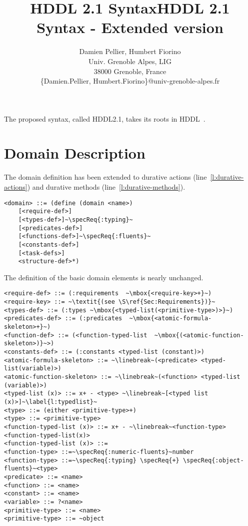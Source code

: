 \documentclass[letterpaper]{article} %
\title{HDDL 2.1 Syntax}
\author{
Damien Pellier, Humbert Fiorino\\
Univ. Grenoble Alpes, LIG\\
38000 Grenoble, France\\
\{Damien.Pellier, Humbert.Fiorino\}@univ-grenoble-alpes.fr}
\title{HDDL 2.1 Syntax - Extended version}
\begin{document}
\maketitle


The proposed syntax, called HDDL2.1, takes its roots in HDDL~\citep{holler20}.

\section{Domain Description}

\newcommand{\specReq}[1]{\ensuremath{\mathtt{^{#1}}}}

The domain definition has been extended to durative actions (line~\ref{l:durative-actions}) and durative methods (line~\ref{l:durative-methods}).
\begin{lstlisting}[escapechar=~]
<domain> ::= (define (domain <name>)
    [<require-def>]
    [<types-def>]~\specReq{:typing}~
    [<predicates-def>]
    [<functions-def>]~\specReq{:fluents}~
    [<constants-def>]
    [<task-defs>]
    <structure-def>*)
\end{lstlisting}

%
%
%

\noindent The definition of the basic domain elements is nearly unchanged.

\begin{lstlisting}[firstnumber=last, escapechar=~]
<require-def> ::= (:requirements  ~\mbox{<require-key>+}~)
<require-key> ::= ~\textit{(see \S\ref{Sec:Requirements})}~
<types-def> ::= (:types ~\mbox{<typed-list(<primitive-type>)>}~)
<predicates-def> ::= (:predicates  ~\mbox{<atomic-formula-skeleton>+}~)
<function-def> ::= (<function-typed-list  ~\mbox{(<atomic-function-skeleton>)}~>)
<constants-def> ::= (:constants <typed-list (constant)>)
<atomic-formula-skeleton> ::= ~\linebreak~(<predicate> <typed-list(variable)>)
<atomic-function-skeleton> ::= ~\linebreak~(<function> <typed-list (variable)>)
<typed-list (x)> ::= x+ - <type> ~\linebreak~[<typed list (x)>]~\label{l:typedlist}~
<type> ::= (either <primitive-type>+)
<type> ::= <primitive-type>
<function-typed-list (x)> ::= x+ - ~\linebreak~<function-type> <function-typed-list(x)>
<function-typed-list (x)> ::=
<function-type> ::=~\specReq{:numeric-fluents}~number
<function-type> ::=~\specReq{:typing} \specReq{+} \specReq{:object-fluents}~<type>
<predicate> ::= <name>
<function> ::= <name>
<constant> ::= <name>
<variable> ::= ?<name>
<primitive-type> ::= <name>
<primitive-type> ::= ~object
\end{lstlisting}
\end{document}
